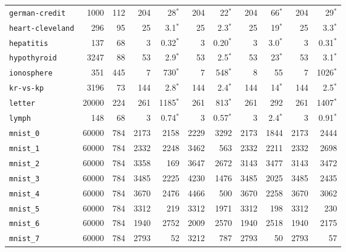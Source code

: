 \begin{tabular}{lccrrrrrrrr}
\texttt{german-credit} & \multicolumn{1}{r}{1000} & \multicolumn{1}{r}{112}  & 204 & 28$^*$ & 204 & 22$^*$ & 204 & 66$^*$ & 204 & 29$^*$\\
\texttt{heart-cleveland} & \multicolumn{1}{r}{296} & \multicolumn{1}{r}{95}  & 25 & 3.1$^*$ & 25 & 2.3$^*$ & 25 & 19$^*$ & 25 & 3.3$^*$\\
\texttt{hepatitis} & \multicolumn{1}{r}{137} & \multicolumn{1}{r}{68}  & 3 & 0.32$^*$ & 3 & 0.20$^*$ & 3 & 3.0$^*$ & 3 & 0.31$^*$\\
\texttt{hypothyroid} & \multicolumn{1}{r}{3247} & \multicolumn{1}{r}{88}  & 53 & 2.9$^*$ & 53 & 2.5$^*$ & 53 & 23$^*$ & 53 & 3.1$^*$\\
\texttt{ionosphere} & \multicolumn{1}{r}{351} & \multicolumn{1}{r}{445}  & 7 & 730$^*$ & 7 & 548$^*$ & 8 & 55 & 7 & 1026$^*$\\
\texttt{kr-vs-kp} & \multicolumn{1}{r}{3196} & \multicolumn{1}{r}{73}  & 144 & 2.8$^*$ & 144 & 2.4$^*$ & 144 & 14$^*$ & 144 & 2.5$^*$\\
\texttt{letter} & \multicolumn{1}{r}{20000} & \multicolumn{1}{r}{224}  & 261 & 1185$^*$ & 261 & 813$^*$ & 261 & 292 & 261 & 1407$^*$\\
\texttt{lymph} & \multicolumn{1}{r}{148} & \multicolumn{1}{r}{68}  & 3 & 0.74$^*$ & 3 & 0.57$^*$ & 3 & 2.4$^*$ & 3 & 0.91$^*$\\
\texttt{mnist\_0} & \multicolumn{1}{r}{60000} & \multicolumn{1}{r}{784}  & 2173 & 2158 & 2229 & 3292 & 2173 & 1844 & 2173 & 2444\\
\texttt{mnist\_1} & \multicolumn{1}{r}{60000} & \multicolumn{1}{r}{784}  & 2332 & 2248 & 3462 & 563 & 2332 & 2211 & 2332 & 2698\\
\texttt{mnist\_2} & \multicolumn{1}{r}{60000} & \multicolumn{1}{r}{784}  & 3358 & 169 & 3647 & 2672 & 3143 & 3477 & 3143 & 3472\\
\texttt{mnist\_3} & \multicolumn{1}{r}{60000} & \multicolumn{1}{r}{784}  & 3485 & 2225 & 4230 & 1476 & 3485 & 2025 & 3485 & 2435\\
\texttt{mnist\_4} & \multicolumn{1}{r}{60000} & \multicolumn{1}{r}{784}  & 3670 & 2476 & 4466 & 500 & 3670 & 2258 & 3670 & 3062\\
\texttt{mnist\_5} & \multicolumn{1}{r}{60000} & \multicolumn{1}{r}{784}  & 3312 & 219 & 3312 & 1971 & 3312 & 198 & 3312 & 230\\
\texttt{mnist\_6} & \multicolumn{1}{r}{60000} & \multicolumn{1}{r}{784}  & 1940 & 2752 & 2009 & 2570 & 1940 & 2518 & 1940 & 2175\\
\texttt{mnist\_7} & \multicolumn{1}{r}{60000} & \multicolumn{1}{r}{784}  & 2793 & 52 & 3212 & 787 & 2793 & 50 & 2793 & 57\\

\end{tabular}
